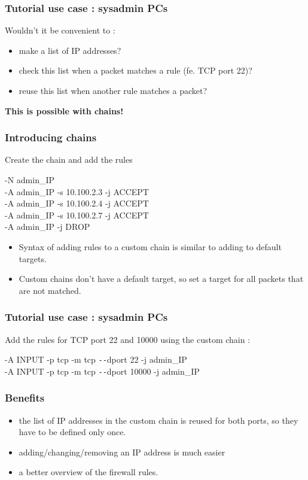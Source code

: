 \documentclass[14pt]{beamer}
\newcommand{\dd}{{\texttt{-{}-}}}
\begin{document}
  \begin{frame}
    \frametitle{Tutorial use case : sysadmin PCs}
    Wouldn't it be convenient to :
    \begin{itemize}
      \item make a list of IP addresses?
      \item check this list when a packet matches a rule (fe. TCP port 22)?
      \item reuse this list when another rule matches a packet?
    \end{itemize}
    \pause
    \textbf{This is possible with chains!}
  \end{frame}
  \begin{frame}
    \frametitle{Introducing chains}
    Create the chain and add the rules
    \begin{example}
      \small{-N admin\_IP\\
      \pause
      -A admin\_IP -s 10.100.2.3 -j ACCEPT\\
      -A admin\_IP -s 10.100.2.4 -j ACCEPT\\
      -A admin\_IP -s 10.100.2.7 -j ACCEPT\\
      -A admin\_IP -j DROP}
    \end{example}
    \pause
    \begin{itemize}[<+->]
      \item Syntax of adding rules to a custom chain is similar to adding to default targets.
      \item Custom chains don't have a default target, so set a target for all packets that are not matched.
    \end{itemize}
  \end{frame}
  \begin{frame}
    \frametitle{Tutorial use case : sysadmin PCs}
    Add the rules for TCP port 22 and 10000 using the custom chain :
    \begin{example}
      \small{-A INPUT -p tcp -m tcp \dd dport 22 -j admin\_IP\\
      -A INPUT -p tcp -m tcp \dd dport 10000 -j admin\_IP}
    \end{example}
  \end{frame}
  \begin{frame}
    \frametitle{Benefits}
    \begin{itemize}
      \item the list of IP addresses in the custom chain is reused for both ports, so they have to be defined only once.
      \item adding/changing/removing an IP address is much easier
      \item a better overview of the firewall rules.
    \end{itemize}
  \end{frame}
\end{document}
